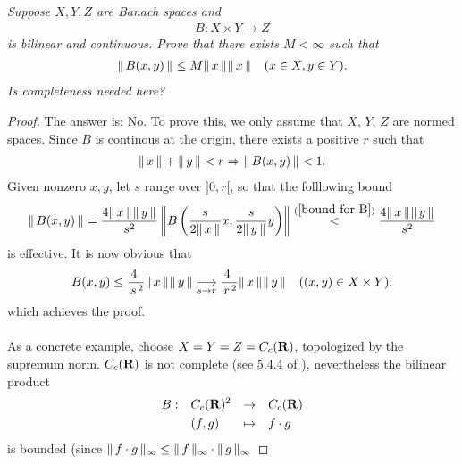 \textit{
Suppose $X,Y,Z$ are Banach spaces and 
%
\begin{align*}
  B:X\times Y \to Z
\end{align*}
%
is bilinear and continuous. Prove that there exists $M<\infty$ such that 
%
\begin{align*}
  \| \,B(x, y) \, \|_{}
  \leq 
  M \| \,x \, \|_{}\| \,x \, \|_{} \quad (x\in X, y\in Y).
\end{align*}
%
Is completeness needed here?}
\begin{proof}%
The answer is: No. To prove this, we only assume that %
%
  $\mathit{X}$, $\mathit{Y}$, $\mathit{Z}$ %
%
are normed spaces. %
%
Since $B$ is continous at the origin, there exists a positive $r$ %
such that %
%
\begin{align}\label{bound for B}
  \norm{}{x} + \norm{}{y} < r \Rightarrow %
  \norm{}{B(x, y)} < 1.
\end{align}
%
%
Given nonzero $\mathit{x}, \mathit{y}$, let $s$ range over $]0, r[$, so that the folllowing bound %
%
\begin{align}
  \norm{}{B(x, y)} = \frac{4\norm{}{x}\norm{}{y}}{s^2} %
    \left\|
      B \left(\frac{s}{2\norm{}{x}}x, \frac{s}{2\norm{}{y}}y \right)
    \right\|
  \overset{(\ref{bound for B})}{<} \frac{4 \norm{}{x} \norm{}{y}}{s^2}
\end{align}
is effective. %
It is now obvious that %
%
\begin{align}
    B(x, y) \leq %
    \frac{\!\!\!4\!}{\,s^{\,2}}\norm{}{x}\norm{}{y} 
    \tendsto{s}{r}
    \frac{\!\!\!4\!}{\,r^{\,2}}\norm{}{x}\norm{}{y}
    \quad ((x, y) \in X \times Y); 
\end{align}
%
which achieves the proof.\\\\ %
As a concrete example, choose %
%
  $X = Y = Z = C_c({\mathbf R})$, %
%
topologized by the supremum norm. %
%
$C_c({\mathbf R})$ is not complete %
%
(see 5.4.4 of \cite{AnalyseIII}), %
%
nevertheless the bilinear product %
%
\begin{align}
  \begin{aligned}
    B: &&& C_c({\mathbf R})^{2} & \to      &&& C_c({\mathbf R}) \\\nonumber 
      &&& (f, g)       & \mapsto  &&& f \cdot g
  \end{aligned}
\end{align}
%
is bounded (since %
    $\| \,f\cdot g \, \|_{\infty} \leq \| \,f \, \|_{\infty}\cdot \| \,g \, \|_{\infty}$%

\end{proof}
